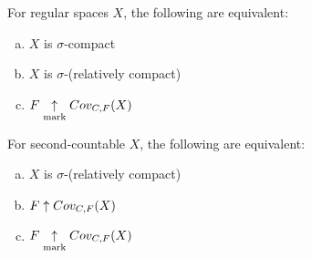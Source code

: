   \begin{corollary}
    For regular spaces $X$, the following are equivalent:
      \begin{enumerate}[(a)]
        \item $X$ is $\sigma$-compact
        \item $X$ is $\sigma$-(relatively compact)
        \item $F \underset{\text{mark}}{\uparrow} Cov_{C,F}(X)$
      \end{enumerate}
  \end{corollary}

  \begin{theorem}
    For second-countable $X$, the following are equivalent:
      \begin{enumerate}[(a)]
        \item $X$ is $\sigma$-(relatively compact)
        \item $F \uparrow Cov_{C,F}(X)$
        \item $F\underset{\text{mark}}{\uparrow} Cov_{C,F}(X)$
      \end{enumerate}
  \end{theorem}

